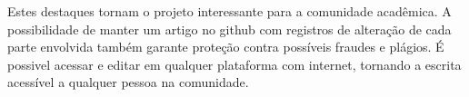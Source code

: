 Estes destaques tornam o projeto interessante para a comunidade acadêmica. A possibilidade de manter um artigo no github com registros de alteração de cada parte envolvida também garante proteção contra possíveis fraudes e plágios. É possivel acessar e editar em qualquer plataforma com internet, tornando a escrita acessível a qualquer pessoa na comunidade.

